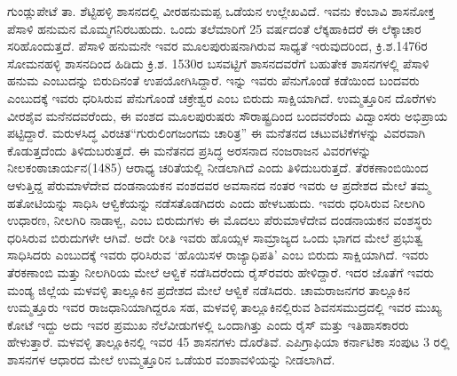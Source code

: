 ಗುಂಡ್ಲುಪೇಟೆ ತಾ. ಶೆಟ್ಟಿಹಳ್ಳಿ ಶಾಸನದಲ್ಲಿ ವೀರಹನುಮಪ್ಪ ಒಡೆಯನ ಉಲ್ಲೇಖವಿದೆ. ಇವನು ಕೆಂಬಾವಿ ಶಾಸನೋಕ್ತ ಪೆಸಾಳಿ ಹನುಮನ ಮೊಮ್ಮಗನಿರಬಹುದು. ಒಂದು ತಲೆಮಾರಿಗೆ 25 ವರ್ಷದಂತೆ ಲೆಕ್ಕಹಾಕಿದರೆ ಈ ಲೆಕ್ಕಾಚಾರ ಸರಿಹೊಂದುತ್ತದೆ. ಪೆಸಾಳಿ ಹನುಮನೇ ಇವರ ಮೂಲಪುರುಷನಾಗಿರುವ ಸಾಧ್ಯತೆ ಇರುವುದರಿಂದ, ಕ್ರಿ.ಶ.1476ರ ಸೋಮನಹಳ್ಳಿ ಶಾಸನದಿಂದ ಹಿಡಿದು ಕ್ರಿ.ಶ. 1530ರ ಬಸವಟ್ಟಿಗೆ ಶಾಸನದವರೆಗೆ ಬಹುತೇಕ ಶಾಸನಗಳಲ್ಲಿ ಪೆಸಾಳಿ ಹನುಮ ಎಂಬುದನ್ನು ಬಿರುದಿನಂತೆ ಉಪಯೋಗಿಸಿದ್ದಾರೆ. ಇನ್ನು ಇವರು ಪೆನುಗೊಂಡೆ ಕಡೆಯಿಂದ ಬಂದವರು ಎಂಬುದಕ್ಕೆ ಇವರು ಧರಿಸಿರುವ ಪೆನುಗೊಂಡೆ ಚಕ್ರೇಶ್ವರ ಎಂಬ ಬಿರುದು ಸಾಕ್ಷಿಯಾಗಿದೆ. ಉಮ್ಮತ್ತೂರಿನ ದೊರೆಗಳು ವೀರಶೈವ ಮನೆನದವರೆಂದು, ಈ ವಂಶದ ಮೂಲಪುರುಷರು ಸೌರಾಷ್ಟ್ರದಿಂದ ಬಂದವರೆಂದು ವಿದ್ವಾಂಸರು ಅಭಿಪ್ರಾಯ ಪಟ್ಟಿದ್ದಾರೆ. ಮರುಳಸಿದ್ಧ ವಿರಚಿತ\break “ಗುರುಲಿಂಗಜಂಗಮ ಚಾರಿತ್ರ” ಈ ಮನೆತನದ ಚಟುವಟಿಕೆಗಳನ್ನು ವಿವರವಾಗಿ ಕೊಡುತ್ತದೆಂದು ತಿಳಿದುಬರುತ್ತದೆ. ಈ ಮನೆತನದ ಪ್ರಸಿದ್ಧ ಅರಸನಾದ ನಂಜರಾಜನ ವಿವರಗಳನ್ನು ನೀಲಕಂಠಾಚಾರ್ಯನ(1485) ಆರಾಧ್ಯ ಚರಿತೆಯಲ್ಲಿ ನೀಡಲಾಗಿದೆ ಎಂದು ತಿಳಿದುಬರುತ್ತದೆ. ತೆರಕಣಾಂಬಿಯಿಂದ ಆಳುತ್ತಿದ್ದ ಪೆರುಮಾಳೆದೇವ ದಂಡನಾಯಕನ ವಂಶದವರ ಅವಸಾನದ ನಂತರ ಇವರು ಆ ಪ್ರದೇಶದ ಮೇಲೆ ತಮ್ಮ ಹತೋಟಿಯನ್ನು ಸಾಧಿಸಿ ಆಳ್ವಿಕೆಯನ್ನು ನಡೆಸತೊಡಗಿದರು ಎಂದು ಹೇಳಬಹುದು. ಇವರು ಧರಿಸಿರುವ ನೀಲಗಿರಿ ಉಧಾರಣ, ನೀಲಗಿರಿ ನಾಡಾಳ್ವ, ಎಂಬ ಬಿರುದುಗಳು ಈ ಮೊದಲು ಪೆರುಮಾಳೆದೇವ ದಂಡನಾಯಕನ ವಂಶಸ್ಥರು ಧರಿಸಿರುವ ಬಿರುದುಗಳೇ ಆಗಿವೆ. ಅದೇ ರೀತಿ ಇವರು ಹೊಯ್ಸಳ ಸಾಮ್ರಾಜ್ಯದ ಒಂದು ಭಾಗದ ಮೇಲೆ ಪ್ರಭುತ್ವ ಸಾಧಿಸಿದರು ಎಂಬುದಕ್ಕೆ ಇವರು ಧರಿಸಿರುವ `ಹೊಯಿಸಳ ರಾಜ್ಯಾಧಿಪತಿ' ಎಂಬ ಬಿರುದು ಸಾಕ್ಷಿಯಾಗಿದೆ. ಇವರು ತೆರಕಣಾಂಬಿ ಮತ್ತು ನೀಲಗಿರಿಯ ಮೇಲೆ ಆಳ್ವಿಕೆ ನಡೆಸಿದರೆಂದು ರೈಸ್​ರವರು ಹೇಳಿದ್ದಾರೆ. ಇದರ ಜೊತೆಗೆ ಇವರು ಮಂಡ್ಯ ಜಿಲ್ಲೆಯ ಮಳವಳ್ಳಿ ತಾಲ್ಲೂಕಿನ ಪ್ರದೇಶದ ಮೇಲೆ ಆಳ್ವಿಕೆ ನಡೆಸಿದರು. ಚಾಮರಾಜನಗರ ತಾಲ್ಲೂಕಿನ ಉಮ್ಮತ್ತೂರು ಇವರ ರಾಜಧಾನಿಯಾಗಿದ್ದರೂ ಸಹ, ಮಳವಳ್ಳಿ ತಾಲ್ಲೂಕಿನಲ್ಲಿರುವ ಶಿವನಸಮುದ್ರದಲ್ಲಿ ಇವರ ಮುಖ್ಯ ಕೋಟೆ ಇದ್ದು ಅದು ಇವರ ಪ್ರಮುಖ ನೆಲೆವೀಡುಗಳಲ್ಲಿ ಒಂದಾಗಿತ್ತು ಎಂದು ರೈಸ್​ ಮತ್ತು ಇತಿಹಾಸಕಾರರು ಹೇಳುತ್ತಾರೆ. ಮಳವಳ್ಳಿ ತಾಲ್ಲೂಕಿನಲ್ಲಿ ಇವರ 4\enginline{-}5 ಶಾಸನಗಳು ದೊರೆತಿವೆ. ಎಪಿಗ್ರಾಫಿಯಾ ಕರ್ನಾಟಿಕಾ ಸಂಪುಟ 3 ರಲ್ಲಿ ಶಾಸನಗಳ ಆಧಾರದ ಮೇಲೆ ಉಮ್ಮತ್ತೂರಿನ ಒಡೆಯರ ವಂಶಾವಳಿಯನ್ನು ನೀಡಲಾಗಿದೆ.

